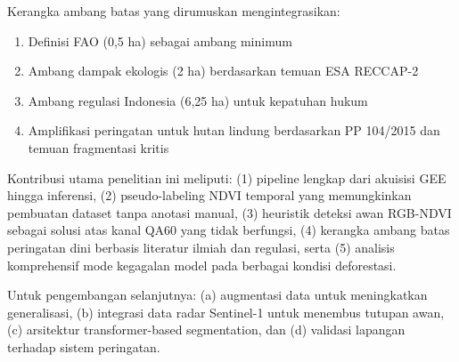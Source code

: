 \documentclass[12pt,a4paper]{article}
\begin{document}
Kerangka ambang batas yang dirumuskan mengintegrasikan:

\begin{enumerate}[nosep]
    \item Definisi FAO (0,5 ha) sebagai ambang minimum
    \item Ambang dampak ekologis (2 ha) berdasarkan temuan ESA RECCAP-2
    \item Ambang regulasi Indonesia (6,25 ha) untuk kepatuhan hukum
    \item Amplifikasi peringatan untuk hutan lindung berdasarkan PP 104/2015
          dan temuan fragmentasi kritis
\end{enumerate}

Kontribusi utama penelitian ini meliputi: (1) pipeline lengkap dari akuisisi GEE
hingga inferensi, (2) pseudo-labeling NDVI temporal yang memungkinkan pembuatan
dataset tanpa anotasi manual, (3) heuristik deteksi awan RGB-NDVI sebagai solusi
atas kanal QA60 yang tidak berfungsi, (4) kerangka ambang batas peringatan dini
berbasis literatur ilmiah dan regulasi, serta (5) analisis komprehensif mode
kegagalan model pada berbagai kondisi deforestasi.

Untuk pengembangan selanjutnya: (a) augmentasi data untuk meningkatkan
generalisasi, (b) integrasi data radar Sentinel-1 untuk menembus tutupan awan,
(c) arsitektur transformer-based segmentation, dan (d) validasi lapangan
terhadap sistem peringatan.



\end{document}

